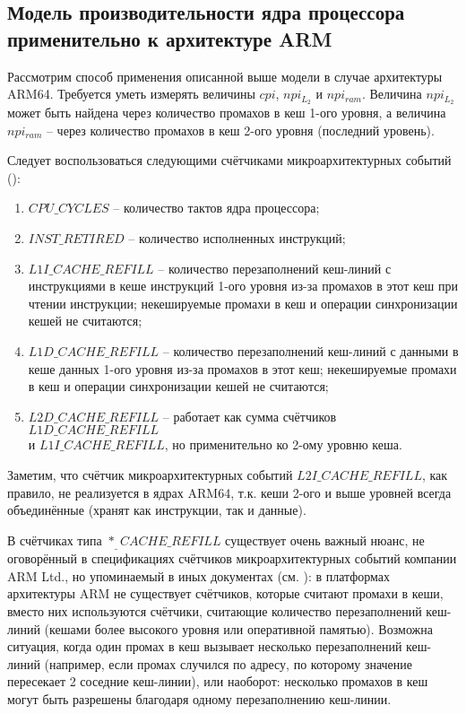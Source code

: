 \subsection{Модель производительности ядра процессора применительно к архитектуре ARM} \label{model_counters}

    Рассмотрим способ применения описанной выше модели в случае архитектуры ARM64.
    Требуется уметь измерять величины $cpi$, $npi_{L_2}$ и $npi_{ram}$. Величина $npi_{L_2}$
    может быть найдена через количество промахов в кеш 1-ого уровня, а величина $npi_{ram}$ --
    через количество промахов в кеш 2-ого уровня (последний уровень).

    Следует воспользоваться следующими счётчиками микроархитектурных событий (\cite{ArmPMUjson}):
    \begin{enumerate}
        \item $CPU\_CYCLES$ -- количество тактов ядра процессора;
        \item $INST\_RETIRED$ -- количество исполненных инструкций;
        \item $L1I\_CACHE\_REFILL$ -- количество перезаполнений кеш-линий с инструкциями в кеше
        инструкций 1-ого уровня из-за промахов в этот кеш при чтении инструкции;
        некешируемые промахи в кеш и операции синхронизации кешей не считаются;
        \item $L1D\_CACHE\_REFILL$ -- количество перезаполнений кеш-линий с данными в кеше данных
        1-ого уровня из-за промахов в этот кеш;
        некешируемые промахи в кеш и операции синхронизации кешей не считаются;
        \item $L2D\_CACHE\_REFILL$ -- работает как сумма счётчиков $L1D\_CACHE\_REFILL$ \\ и
        $L1I\_CACHE\_REFILL$, но применительно ко 2-ому уровню кеша.
    \end{enumerate}

    Заметим, что счётчик микроархитектурных событий $L2I\_CACHE\_REFILL$, как правило, не реализуется
    в ядрах ARM64, т.к. кеши 2-ого и выше уровней всегда объединённые (хранят как инструкции, так и данные).

    В счётчиках типа $*_\_CACHE\_REFILL$ существует очень важный нюанс, не оговорённый
    в спецификациях счётчиков микроархитектурных событий компании ARM Ltd., но упоминаемый
    в иных документах (см. \cite{ArmPerfAnalyses}): в платформах архитектуры ARM не существует счётчиков,
    которые считают промахи в кеши, вместо них используются счётчики, считающие
    количество перезаполнений кеш-линий (кешами более высокого уровня или оперативной памятью).
    Возможна ситуация, когда один промах в кеш вызывает несколько перезаполнений кеш-линий
    (например, если промах случился по адресу, по которому значение пересекает 2 соседние кеш-линии),
    или наоборот: несколько промахов в кеш могут быть разрешены благодаря одному перезаполнению кеш-линии.

